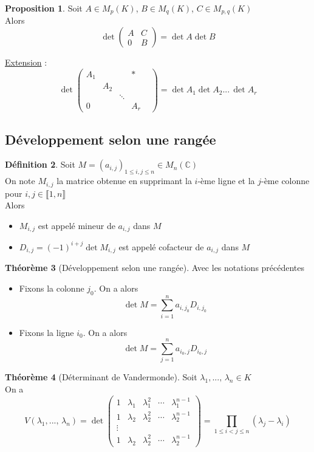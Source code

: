 \documentclass[10pt,a4paper]{article}
\theoremstyle{definition}
\newtheorem{proposition}{Proposition}[section]
\newtheorem{theorem}[proposition]{Théorème}
\newtheorem{definition}[proposition]{Définition}
\begin{document}
\begin{proposition}
Soit $A \in M_p(K)$, $B \in M_q(K)$, $C \in M_{p, q}(K)$ \\
Alors
\[ \det \left(\begin{array}{c|c}
A & C \\
\hline
0 & B
\end{array}\right) = \det A \det B \]
\end{proposition}
\noindent \uline{Extension} :
\[ \det \begin{pmatrix}
A_1 & & & * \\
& A_2 & & & \\
& & \ddots & \\
0 & & & A_r
\end{pmatrix} = \det A_1 \det A_2 ...\, \det A_r \]

\pagebreak

\subsection{Développement selon une rangée}
\begin{definition}
Soit $M = (a_{i,j})_{1 \leq i,j \leq n} \in M_n(\mathbb{C})$ \\
On note $M_{i, j}$ la matrice obtenue en supprimant la $i$-ème ligne et la $j$-ème colonne pour $i, j \in \llbracket 1, n \rrbracket$ \\
Alors
\begin{itemize}
\item $M_{i, j}$ est appelé mineur de $a_{i, j}$ dans $M$
\item $D_{i, j} = (-1)^{i + j} \det M_{i, j}$ est appelé cofacteur de $a_{i, j}$ dans $M$
\end{itemize}
\end{definition}
\begin{theorem}[Développement selon une rangée]
Avec les notations précédentes
\begin{itemize}
\item Fixons la colonne $j_0$. On a alors
\[ \det M = \sum_{i = 1}^n a_{i, j_0} D_{i, j_0} \]
\item Fixons la ligne $i_0$. On a alors
\[ \det M = \sum_{j = 1}^n a_{i_0, j} D_{i_0, j} \]
\end{itemize}
\end{theorem}
\begin{theorem}[Déterminant de Vandermonde]
Soit $\lambda_1, ...,\, \lambda_n \in K$ \\
On a
\[ V(\lambda_1, ...,\, \lambda_n) = \det \begin{pmatrix}
1 & \lambda_1 & \lambda_1^2 & \cdots & \lambda_1^{n - 1} \\
1 & \lambda_2 & \lambda_2^2 & \cdots & \lambda_2^{n - 1} \\
\vdots \\
1 & \lambda_2 & \lambda_2^2 & \cdots & \lambda_2^{n - 1} 
\end{pmatrix} = \prod_{1 \leq i < j \leq n}(\lambda_j - \lambda_i)\]
\end{theorem}
\end{document}
